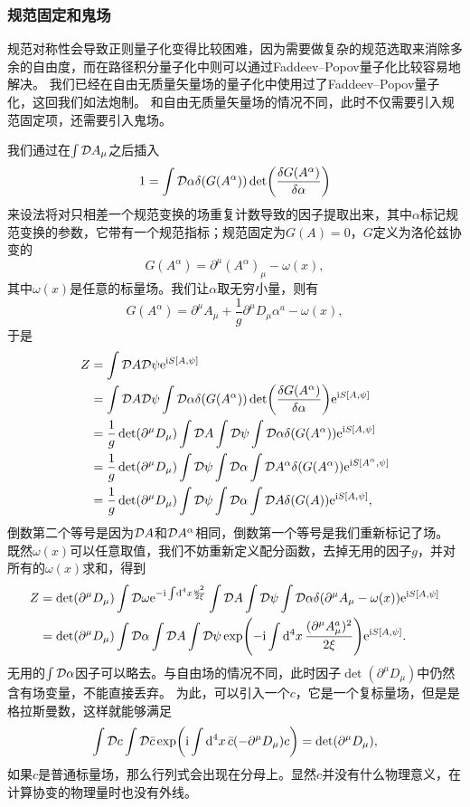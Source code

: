 \subsubsection{规范固定和鬼场}

规范对称性会导致正则量子化变得比较困难，因为需要做复杂的规范选取来消除多余的自由度，而在路径积分量子化中则可以通过Faddeev–Popov量子化比较容易地解决。
我们已经在自由无质量矢量场的量子化中使用过了Faddeev–Popov量子化，这回我们如法炮制。
和自由无质量矢量场的情况不同，此时不仅需要引入规范固定项，还需要引入鬼场。

我们通过在$\int \mathcal{D} A_\mu$之后插入
\[
    1 = \int \fd{\alpha} \delta(G(A^\alpha)) \det(\fdv{G(A^\alpha)}{\alpha})
\]
来设法将对只相差一个规范变换的场重复计数导致的因子提取出来，其中$\alpha$标记规范变换的参数，它带有一个规范指标；规范固定为$G(A)=0$，$G$定义为洛伦兹协变的
\begin{equation}
    G(A^\alpha) = \partial^\mu (A^\alpha)_\mu - \omega(x),
\end{equation}
其中$\omega(x)$是任意的标量场。我们让$\alpha$取无穷小量，则有
\[
    G(A^\alpha) = \partial^\mu A_\mu + \frac{1}{g} \partial^\mu D_\mu \alpha^a - \omega(x),
\]
于是
\[
    \begin{aligned}
        Z &= \int \fd{A} \fd{\psi} \ee^{\ii S[A, \psi]} \\
        &= \int \fd{A} \fd{\psi} \int \fd{\alpha} \delta(G(A^\alpha)) \det(\fdv{G(A^\alpha)}{\alpha}) \ee^{\ii S[A, \psi]} \\
        &= \frac{1}{g} \det(\partial^\mu D_\mu) \int \fd{A} \int \fd{\psi} \int \fd{\alpha} \delta(G(A^\alpha)) \ee^{\ii S[A, \psi]} \\
        &= \frac{1}{g} \det(\partial^\mu D_\mu) \int \fd{\psi} \int \fd{\alpha} \int \fd{A^\alpha} \delta(G(A^\alpha)) \ee^{\ii S[A^\alpha, \psi]} \\
        &= \frac{1}{g} \det(\partial^\mu D_\mu) \int \fd{\psi} \int \fd{\alpha} \int \fd{A} \delta(G(A)) \ee^{\ii S[A, \psi]},
    \end{aligned}
\]
倒数第二个等号是因为$\mathcal{D} A$和$\mathcal{D} A^\alpha$相同，倒数第一个等号是我们重新标记了场。
既然$\omega(x)$可以任意取值，我们不妨重新定义配分函数，去掉无用的因子$g$，并对所有的$\omega(x)$求和，得到
\[
    \begin{aligned}
        Z &= \det(\partial^\mu D_\mu) \int \mathcal{D} \omega \mathrm{e}^{-\mathrm{i} \int \dd[4]{x} \frac{\omega^2}{2 \xi}} \int \mathcal{D} A \int \mathcal{D} \psi \int \mathcal{D} \alpha \delta(\partial^\mu A_\mu - \omega(x)) \mathrm{e}^{\mathrm{i} S[A, \psi]} \\
        &= \det(\partial^\mu D_\mu) \int \mathcal{D} \alpha \int \mathcal{D} A \int \mathcal{D} \psi \exp(-\mathrm{i} \int \dd[4]{x} \frac{(\partial^\mu A_\mu^a)^2}{2 \xi}) \mathrm{e}^{\mathrm{i} S[A, \psi]}.
    \end{aligned}
\]
无用的$\int \mathcal{D} \alpha$因子可以略去。与自由场的情况不同，此时因子$\det(\partial^\mu D_\mu)$中仍然含有场变量，不能直接丢弃。
为此，可以引入一个$c$，它是一个复标量场，但是是格拉斯曼数，这样就能够满足
\[
    \int \mathcal{D} c \int \mathcal{D} \bar{c} \exp(\mathrm{i} \int \dd[4]{x} \bar{c} (- \partial^\mu D_\mu) c) = \det(\partial^\mu D_\mu),
\]
如果$c$是普通标量场，那么行列式会出现在分母上。显然$c$并没有什么物理意义，在计算协变的物理量时也没有外线。

